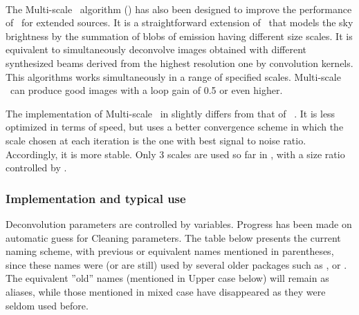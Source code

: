 \paragraph{}

The Multi-scale \clean\ algorithm (\cite{cornwell0X}) has also been 
designed to improve the performance of \clean\ for extended sources.  
It is a straightforward extension of \clean\ that models the sky 
brightness by the summation of blobs of emission having different size 
scales.  It is equivalent to simultaneously deconvolve images obtained 
with different synthesized beams derived from the highest resolution 
one by convolution kernels. This algorithms works simultaneously in a 
range of specified scales. Multi-scale \clean\ can produce good images 
with a loop gain of 0.5 or even higher. 
 
 
The implementation of Multi-scale \clean\ in  \imager{} slightly 
differs from that of \casa\ . It is less optimized in terms of speed, 
but uses a better convergence scheme in which the scale chosen at each 
iteration is the one with best signal to noise ratio. Accordingly, it 
is more stable. Only 3 scales are used so far in \imager , with a size 
ratio controlled by .

\subsubsection{Implementation and typical use}

Deconvolution parameters are controlled by  variables. 
Progress has been made on automatic guess for Cleaning parameters. The 
table below presents the current naming scheme, with previous or 
equivalent names mentioned in parentheses, since these names were (or 
are still) used by several older packages such as \mapping{}, \aips{} 
or \casa{}. The equivalent ''old'' names (mentioned in Upper case 
below) will remain as aliases, while those mentioned in mixed case have 
disappeared as they were seldom used before. 
 
